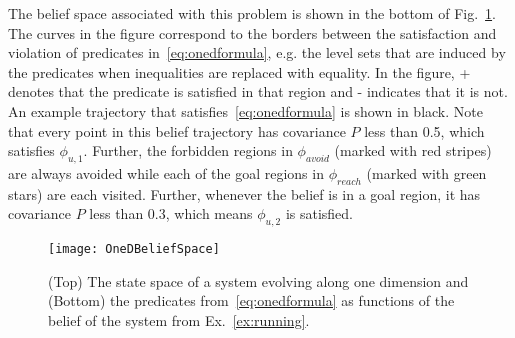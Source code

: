 \begin{example}
The belief space associated with this problem is shown in the bottom of Fig.~\ref{fig:OneDExample}.
The curves in the figure correspond to the borders between the satisfaction and
violation of predicates in~\eqref{eq:onedformula}, e.g. the level sets that
are induced by the predicates when inequalities are replaced with equality. In
the figure, + denotes that the predicate is satisfied in that region and - indicates that it is not.
An example trajectory that satisfies~\eqref{eq:onedformula} is shown in black. Note
that every point in this belief trajectory has covariance $P$ less than 0.5, which
satisfies $\phi_{u,1}$. Further, the forbidden regions in $\phi_{avoid}$ (marked with red stripes)
are always avoided while each of the goal regions in $\phi_{reach}$ 
(marked with green stars) are each visited. Further, whenever the belief 
is in a goal region, it has covariance $P$ less than 0.3, which means $\phi_{u,2}$
is satisfied.
\endproof
\end{example}

%

\begin{figure}[!htb]
\centering
\texttt{[image: OneDBeliefSpace]}
\caption{(Top) The state space of a system evolving along one dimension and (Bottom) the predicates from~\eqref{eq:onedformula} as functions of the belief of the system from Ex.~\ref{ex:running}.}
\label{fig:OneDExample}
\end{figure}
